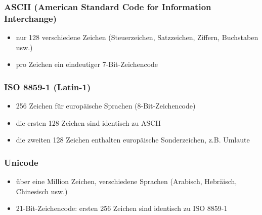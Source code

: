 \documentclass[a4paper,10pt]{article}
\begin{document}
\subsubsection{ASCII (American Standard Code for Information Interchange)}
\begin{itemize}
	\item nur 128 verschiedene Zeichen (Steuerzeichen, Satzzeichen, Ziffern, Buchstaben usw.)
	\item pro Zeichen ein eindeutiger 7-Bit-Zeichencode
\end{itemize}
\subsubsection{ISO 8859-1 (Latin-1)}
\begin{itemize}
	\item 256 Zeichen f\"ur europ\"aische Sprachen (8-Bit-Zeichencode)
	\item die ersten 128 Zeichen sind identisch zu ASCII
	\item die zweiten 128 Zeichen enthalten europ\"aische Sonderzeichen, z.B. Umlaute
\end{itemize}
\subsubsection{Unicode}
\begin{itemize}
	\item \"uber eine Million Zeichen, verschiedene Sprachen (Arabisch, Hebr\"aisch, Chinesisch usw.)
	\item 21-Bit-Zeichencode: ersten 256 Zeichen sind identisch zu ISO 8859-1
\end{itemize}
\end{document}
